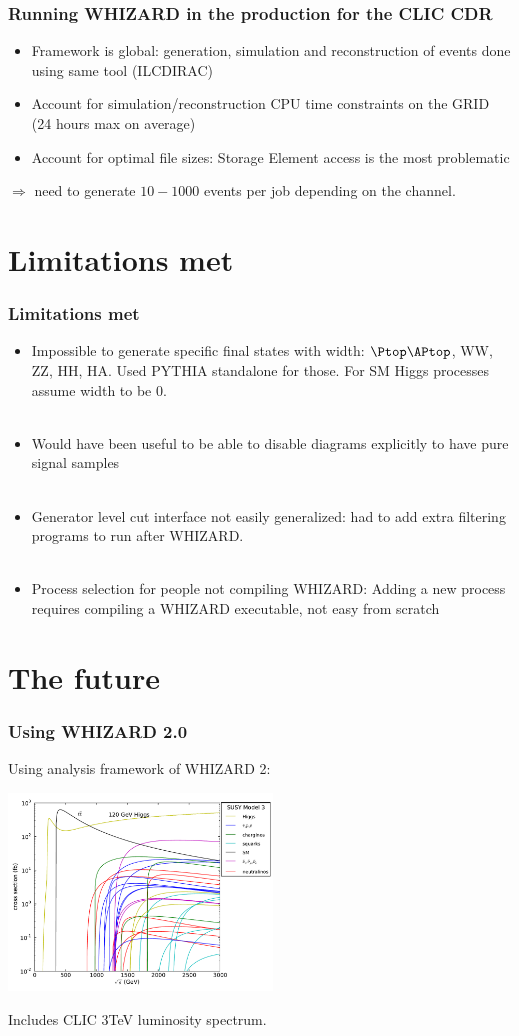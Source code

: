 \documentclass{beamer}
\newcommand{\whizard}{WHIZARD\xspace}
\begin{document}
\begin{frame}
\frametitle{Running \whizard in the production for the CLIC CDR}
\begin{itemize}
  \item Framework is global: generation, simulation and reconstruction of events
  done using same tool (ILCDIRAC)
  \item Account for simulation/reconstruction CPU time constraints on the GRID
  (24 hours max on average)
  \item Account for optimal file sizes: Storage Element access is the most
  problematic
\end{itemize}
$\Rightarrow$ \alert{need to generate $10-1000$ events per job} depending on the
channel.
\end{frame}
\section{Limitations met}
\begin{frame}
\frametitle{Limitations met}
\begin{itemize}
  \item Impossible to generate specific final states with width: $\Ptop\APtop$,
  WW, ZZ, HH, HA. {\color{blue}Used PYTHIA standalone} for those. For SM Higgs
  processes assume width to be 0.\\
  ~\\
  \item Would have been useful to be able to {\color{blue}disable diagrams
  explicitly} to have pure signal samples\\
  ~\\
  \item Generator level cut interface not easily generalized: had to
  {\color{blue}add extra filtering programs} to run after \whizard.\\
  ~\\
  \item Process selection for people not compiling \whizard: Adding a
  {\color{blue}new process requires compiling a \whizard executable}, not easy
  from scratch
\end{itemize}
\end{frame}
\section{The future}
\begin{frame}
\frametitle{Using \whizard 2.0}
Using analysis framework of \whizard2:
\begin{center}
\includegraphics[width=7cm]{./model3.pdf}
\end{center}
Includes CLIC 3TeV luminosity spectrum.
\end{frame}
\end{document}
